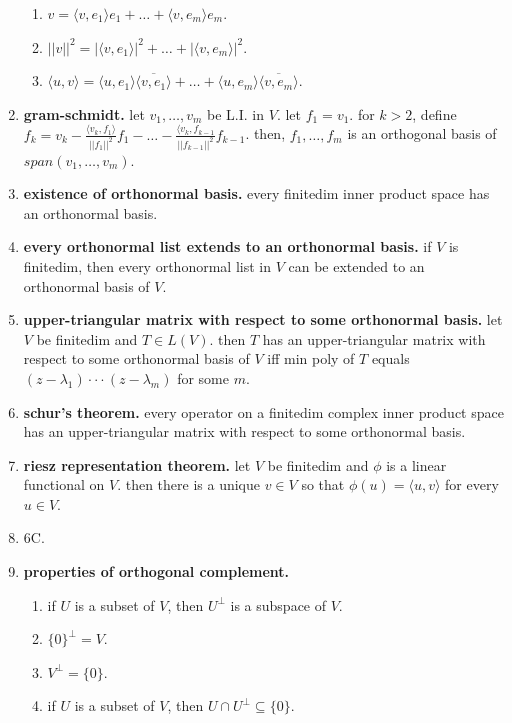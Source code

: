 \begin{enumerate}
	\begin{enumerate}
		\item $v = \langle v,e_1 \rangle e_1 + \dots + \langle v,e_m \rangle e_m$. 
		\item $||v||^2 = |\langle v,e_1 \rangle|^2 + \dots + |\langle v,e_m \rangle|^2$. 
		\item $\langle u,v \rangle = \langle u,e_1 \rangle \overline{\langle v,e_1 \rangle} + \dots + \langle u,e_m \rangle \overline{\langle v,e_m \rangle}$. 
	\end{enumerate}
	\item \textbf{gram-schmidt. } let $v_1,\dots,v_m$ be L.I. in $V$. let $f_1 = v_1$. for $k > 2$, define $f_k = v_k - \frac{\langle v_k,f_1 \rangle}{||f_1||^2}f_1 - \dots - \frac{\langle v_k,f_{k-1}}{||f_{k-1}||^2}f_{k-1}$. then, $f_1,\dots,f_m$ is an orthogonal basis of $span(v_1,\dots,v_m)$. 
	\item \textbf{existence of orthonormal basis. } every finitedim inner product space has an orthonormal basis. 
	\item \textbf{every orthonormal list extends to an orthonormal basis. } if $V$ is finitedim, then every orthonormal list in $V$ can be extended to an orthonormal basis of $V$. 
	\item \textbf{upper-triangular matrix with respect to some orthonormal basis. } let $V$ be finitedim and $T \in L(V)$. then $T$ has an upper-triangular matrix with respect to some orthonormal basis of $V$ iff min poly of $T$ equals $(z-\lambda_1) \cdot \cdot \cdot (z-\lambda_m)$ for some $m$. 
	\item \textbf{schur's theorem. } every operator on a finitedim complex inner product space has an upper-triangular matrix with respect to some orthonormal basis. 
	\item \textbf{riesz representation theorem. } let $V$ be finitedim and $\phi$ is a linear functional on $V$. then there is a unique $v \in V$ so that $\phi(u) = \langle u,v \rangle$ for every $u \in V$. 
	\item 6C. 
	\item \textbf{properties of orthogonal complement. } 
	\begin{enumerate}
		\item if $U$ is a subset of $V$, then $U^\perp$ is a subspace of $V$. 
		\item $\{0\}^\perp = V$. 
		\item $V^\perp = \{0\}$. 
		\item if $U$ is a subset of $V$, then $U \cap U^\perp \subseteq \{0\}$. 

\end{enumerate}
\end{enumerate}
